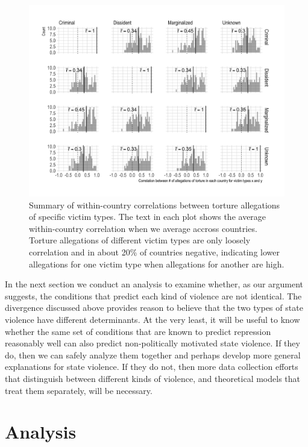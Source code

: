 \documentclass[11pt]{article}
\begin{document}
\begin{figure}
\begin{center}
\caption{Summary of within-country correlations between torture allegations of specific victim types. The text in each plot shows the average within-country correlation when we average accross countries. Torture allegations of different victim types are only loosely correlation and in about 20\% of countries negative, indicating lower allegations for one victim type when allegations for another are high.}
\label{fig:correlation-matrix}
\includegraphics[width=.99\textwidth]{../output/figures/allegations-by-victim-pairwise-correlations.png}
\end{center}
\end{figure}

In the next section we conduct an analysis to examine whether, as our argument suggests, the conditions that predict each kind of violence are not identical. The divergence discussed above provides reason to believe that the two types of state violence have different determinants. At the very least, it will be useful to know whether the same set of conditions that are known to predict repression reasonably well can also predict non-politically motivated state violence. If they do, then we can safely analyze them together and perhaps develop more general explanations for state violence. If they do not, then more data collection efforts that distinguish between different kinds of violence, and theoretical models that treat them separately, will be necessary.  

\section*{Analysis}
\end{document}
